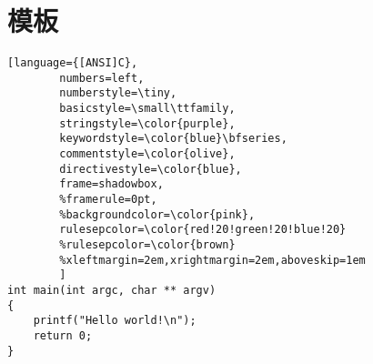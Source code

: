\chapter{模板}

\begin{lstlisting}[language={[ANSI]C},
        numbers=left,
        numberstyle=\tiny,
        basicstyle=\small\ttfamily,
        stringstyle=\color{purple},
        keywordstyle=\color{blue}\bfseries,
        commentstyle=\color{olive},
        directivestyle=\color{blue},
        frame=shadowbox,
        %framerule=0pt,
        %backgroundcolor=\color{pink},
        rulesepcolor=\color{red!20!green!20!blue!20}
        %rulesepcolor=\color{brown}
        %xleftmargin=2em,xrightmargin=2em,aboveskip=1em
        ]
int main(int argc, char ** argv)
{
	printf("Hello world!\n");
	return 0;
}
\end{lstlisting}